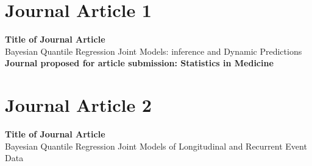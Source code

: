 \documentclass[12pt]{article}
\numberwithin{figure}{section}
\numberwithin{table}{section}
\numberwithin{equation}{section}
\begin{document}




\newpage
\tableofcontents
\doublespacing

\newpage
\setcounter{page}{1}
\doublespacing
\listoftables{}


\newpage
\doublespacing
\listoffigures{}


\newpage
\setcounter{page}{1}
\doublespacing




\newpage
\section{Journal Article 1}

{\bf Title of Journal Article}\\
Bayesian Quantile Regression Joint Models: inference and Dynamic Predictions\\

{\bf Journal proposed for article submission: Statistics in Medicine} \\


\newpage

\begin{bibunit}[apa]






\putbib[paper1]
\end{bibunit}

\newpage
\section{Journal Article 2}

{\bf Title of Journal Article}\\
Bayesian Quantile Regression Joint Models of Longitudinal and Recurrent Event Data
\end{document}
